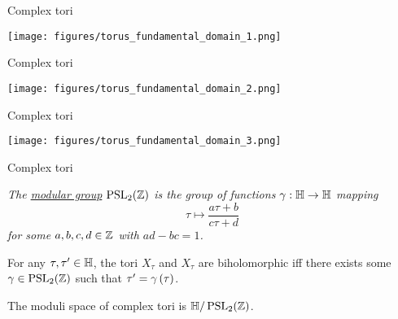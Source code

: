 \documentclass{beamer}
\begin{document}
    \begin{frame}{Complex tori}
        \begin{center}
            \texttt{[image: figures/torus\_fundamental\_domain\_1.png]}
        \end{center}
    \end{frame}
    \begin{frame}{Complex tori}
        \begin{center}
            \texttt{[image: figures/torus\_fundamental\_domain\_2.png]}
        \end{center}
    \end{frame}
    \begin{frame}{Complex tori}
        \begin{center}
            \texttt{[image: figures/torus\_fundamental\_domain\_3.png]}
        \end{center}
    \end{frame}
    \begin{frame}{Complex tori}
        \begin{definition}
            \textit{The \ul{modular group} $\operatorname{PSL}_{2}\!\left(\mathbb{Z}\right)$ is the group of functions $\gamma:\mathbb{H}\to\mathbb{H}$ mapping}
            \begin{equation*}
                \tau\mapsto\frac{a\tau+b}{c\tau+d}
            \end{equation*}
            \textit{for some $a,b,c,d\in\mathbb{Z}$ with $ad-bc=1$.}
        \end{definition}

        \pause

        \begin{theorem}
            For any $\tau,\tau'\in\mathbb{H}$, the tori $X_\tau$ and $X_{\tau}$ are biholomorphic iff there exists some $\gamma\in\operatorname{PSL}_{2}\!\left(\mathbb{Z}\right)$ such that $\tau'=\gamma\left(\tau\right)$.
        \end{theorem}

        \pause

        \begin{corollary}
            The moduli space of complex tori is $\mathbb{H}/\operatorname{PSL}_{2}\!\left(\mathbb{Z}\right)$.
        \end{corollary}
    \end{frame}
\end{document}
